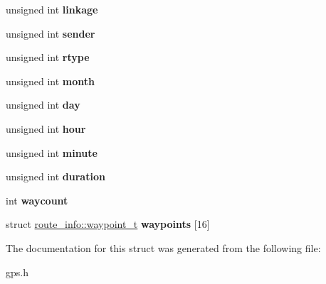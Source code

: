 \begin{DoxyCompactItemize}
\item 
\hypertarget{structroute__info_a3239cc5274f3b88e58b9c3fcf0376845}{unsigned int {\bfseries linkage}}\label{structroute__info_a3239cc5274f3b88e58b9c3fcf0376845}

\item 
\hypertarget{structroute__info_ae2266ef1ca493ca14b4512c8219d4fd4}{unsigned int {\bfseries sender}}\label{structroute__info_ae2266ef1ca493ca14b4512c8219d4fd4}

\item 
\hypertarget{structroute__info_af3279ed5e9f71f834dd6caf3d156d74e}{unsigned int {\bfseries rtype}}\label{structroute__info_af3279ed5e9f71f834dd6caf3d156d74e}

\item 
\hypertarget{structroute__info_a91e9564c3a5519fb228aa6d399ffb548}{unsigned int {\bfseries month}}\label{structroute__info_a91e9564c3a5519fb228aa6d399ffb548}

\item 
\hypertarget{structroute__info_afc28b4aac35368d5051a9e1207c16f03}{unsigned int {\bfseries day}}\label{structroute__info_afc28b4aac35368d5051a9e1207c16f03}

\item 
\hypertarget{structroute__info_a6cbf839d8c8ca91d6c8142a5c869d03d}{unsigned int {\bfseries hour}}\label{structroute__info_a6cbf839d8c8ca91d6c8142a5c869d03d}

\item 
\hypertarget{structroute__info_acf5a71515660177435254fa28da3cefe}{unsigned int {\bfseries minute}}\label{structroute__info_acf5a71515660177435254fa28da3cefe}

\item 
\hypertarget{structroute__info_a7c7e005d5997aaaf52b2782fb787a8f2}{unsigned int {\bfseries duration}}\label{structroute__info_a7c7e005d5997aaaf52b2782fb787a8f2}

\item 
\hypertarget{structroute__info_a783b5bd70407cfd53b06607d3670dfae}{int {\bfseries waycount}}\label{structroute__info_a783b5bd70407cfd53b06607d3670dfae}

\item 
\hypertarget{structroute__info_aab103ea1d99e5b854edc8af9d41e30a7}{struct \hyperlink{structroute__info_1_1waypoint__t}{route\-\_\-info\-::waypoint\-\_\-t} {\bfseries waypoints} \mbox{[}16\mbox{]}}\label{structroute__info_aab103ea1d99e5b854edc8af9d41e30a7}

\end{DoxyCompactItemize}


\-The documentation for this struct was generated from the following file\-:\begin{DoxyCompactItemize}
\item 
gps.\-h\end{DoxyCompactItemize}
